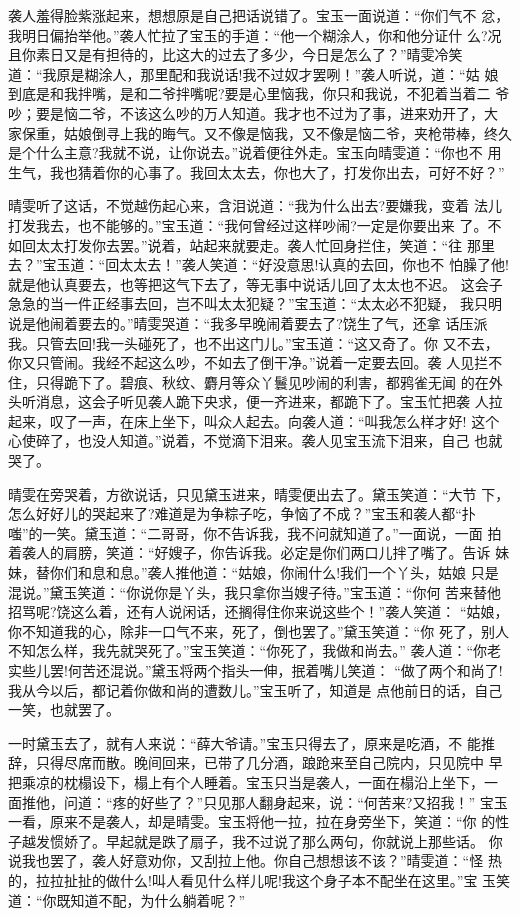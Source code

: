 袭人羞得脸紫涨起来，想想原是自己把话说错了。宝玉一面说道：“你们气不
忿，我明日偏抬举他。”袭人忙拉了宝玉的手道：“他一个糊涂人，你和他分证什
么?况且你素日又是有担待的，比这大的过去了多少，今日是怎么了？”晴雯冷笑
道：“我原是糊涂人，那里配和我说话!我不过奴才罢咧！”袭人听说，道：“姑
娘到底是和我拌嘴，是和二爷拌嘴呢?要是心里恼我，你只和我说，不犯着当着二
爷吵；要是恼二爷，不该这么吵的万人知道。我才也不过为了事，进来劝开了，大
家保重，姑娘倒寻上我的晦气。又不像是恼我，又不像是恼二爷，夹枪带棒，终久
是个什么主意?我就不说，让你说去。”说着便往外走。宝玉向晴雯道：“你也不
用生气，我也猜着你的心事了。我回太太去，你也大了，打发你出去，可好不好？”

晴雯听了这话，不觉越伤起心来，含泪说道：“我为什么出去?要嫌我，变着
法儿打发我去，也不能够的。”宝玉道：“我何曾经过这样吵闹?一定是你要出来
了。不如回太太打发你去罢。”说着，站起来就要走。袭人忙回身拦住，笑道：“往
那里去？”宝玉道：“回太太去！”袭人笑道：“好没意思!认真的去回，你也不
怕臊了他!就是他认真要去，也等把这气下去了，等无事中说话儿回了太太也不迟。
这会子急急的当一件正经事去回，岂不叫太太犯疑？”宝玉道：“太太必不犯疑，
我只明说是他闹着要去的。”晴雯哭道：“我多早晚闹着要去了?饶生了气，还拿
话压派我。只管去回!我一头碰死了，也不出这门儿。”宝玉道：“这又奇了。你
又不去，你又只管闹。我经不起这么吵，不如去了倒干净。”说着一定要去回。袭
人见拦不住，只得跪下了。碧痕、秋纹、麝月等众丫鬟见吵闹的利害，都鸦雀无闻
的在外头听消息，这会子听见袭人跪下央求，便一齐进来，都跪下了。宝玉忙把袭
人拉起来，叹了一声，在床上坐下，叫众人起去。向袭人道：“叫我怎么样才好!
这个心使碎了，也没人知道。”说着，不觉滴下泪来。袭人见宝玉流下泪来，自己
也就哭了。

晴雯在旁哭着，方欲说话，只见黛玉进来，晴雯便出去了。黛玉笑道：“大节
下，怎么好好儿的哭起来了?难道是为争粽子吃，争恼了不成？”宝玉和袭人都“扑
嗤”的一笑。黛玉道：“二哥哥，你不告诉我，我不问就知道了。”一面说，一面
拍着袭人的肩膀，笑道：“好嫂子，你告诉我。必定是你们两口儿拌了嘴了。告诉
妹妹，替你们和息和息。”袭人推他道：“姑娘，你闹什么!我们一个丫头，姑娘
只是混说。”黛玉笑道：“你说你是丫头，我只拿你当嫂子待。”宝玉道：“你何
苦来替他招骂呢?饶这么着，还有人说闲话，还搁得住你来说这些个！”袭人笑道：
“姑娘，你不知道我的心，除非一口气不来，死了，倒也罢了。”黛玉笑道：“你
死了，别人不知怎么样，我先就哭死了。”宝玉笑道：“你死了，我做和尚去。”
袭人道：“你老实些儿罢!何苦还混说。”黛玉将两个指头一伸，抿着嘴儿笑道：
“做了两个和尚了!我从今以后，都记着你做和尚的遭数儿。”宝玉听了，知道是
点他前日的话，自己一笑，也就罢了。

一时黛玉去了，就有人来说：“薛大爷请。”宝玉只得去了，原来是吃酒，不
能推辞，只得尽席而散。晚间回来，已带了几分酒，踉跄来至自己院内，只见院中
早把乘凉的枕榻设下，榻上有个人睡着。宝玉只当是袭人，一面在榻沿上坐下，一
面推他，问道：“疼的好些了？”只见那人翻身起来，说：“何苦来?又招我！”
宝玉一看，原来不是袭人，却是晴雯。宝玉将他一拉，拉在身旁坐下，笑道：“你
的性子越发惯娇了。早起就是跌了扇子，我不过说了那么两句，你就说上那些话。
你说我也罢了，袭人好意劝你，又刮拉上他。你自己想想该不该？”晴雯道：“怪
热的，拉拉扯扯的做什么!叫人看见什么样儿呢!我这个身子本不配坐在这里。”宝
玉笑道：“你既知道不配，为什么躺着呢？”

